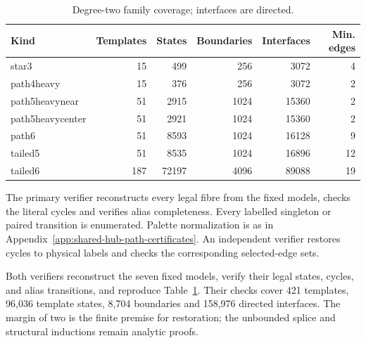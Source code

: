 \documentclass[11pt]{article}
\numberwithin{equation}{section}
\numberwithin{table}{section}
\begin{document}
\begin{table}[htbp]
\centering\small
\caption{Degree-two family coverage; interfaces are directed.}
\label{tab:degree-two-family-counts}
\begin{tabular}{lrrrrr}
\toprule
Kind & Templates & States & Boundaries & Interfaces & Min. edges\\
\midrule
star3&15&499&256&3072&4\\
path4heavy&15&376&256&3072&2\\
path5heavynear&51&2915&1024&15360&2\\
path5heavycenter&51&2921&1024&15360&2\\
path6&51&8593&1024&16128&9\\
tailed5&51&8535&1024&16896&12\\
tailed6&187&72197&4096&89088&19\\
\bottomrule
\end{tabular}
\end{table}

The primary verifier reconstructs every legal fibre from the fixed models,
checks the literal cycles and verifies alias completeness. Every labelled
singleton or paired transition is enumerated. Palette normalization is as in
Appendix~\ref{app:shared-hub-path-certificates}. An independent verifier
restores cycles to physical labels and checks the corresponding selected-edge
sets.

Both verifiers reconstruct the seven fixed models, verify their legal states,
cycles, and alias transitions, and reproduce
Table~\ref{tab:degree-two-family-counts}. Their checks cover 421 templates,
96,036 template states, 8,704 boundaries and 158,976 directed interfaces.
The margin of two is the finite premise for restoration; the unbounded splice
and structural inductions remain analytic proofs.

\clearpage
\end{document}
